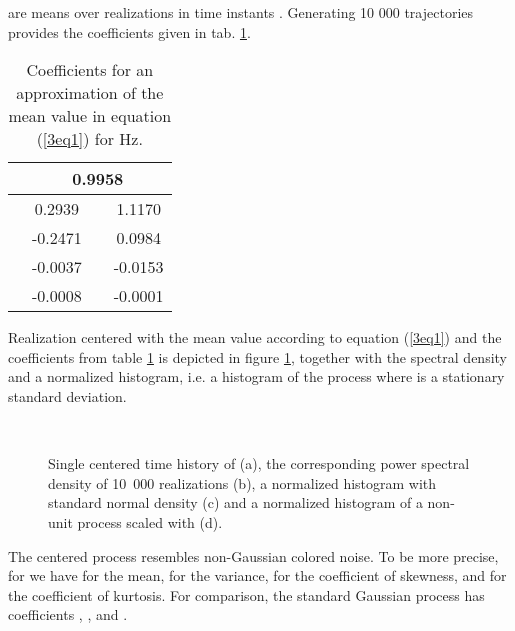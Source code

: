 \documentclass[preprint,12pt,authoryear]{elsarticle}
\begin{document}
are means over  realizations  in time instants . Generating 10 000 trajectories provides the coefficients given in tab. \ref{3tab1}.
\begin{table}
	\centering
	\caption{Coefficients  for an approximation of the mean value in equation (\ref{3eq1}) for  Hz.}
	\begin{tabular}{|c|c|c|c|}\hline
	 & \multicolumn{3}{c|}{0.9958} \\\hline
	 & 0.2939 &  & 1.1170 \\
	 & -0.2471 &  & 0.0984 \\
	 & -0.0037 &  & -0.0153 \\
	 & -0.0008 &  & -0.0001 \\\hline
	\end{tabular}
	\label{3tab1}
\end{table}
Realization centered with the mean value according to equation (\ref{3eq1}) and the coefficients from table \ref{3tab1} is  depicted in figure \ref{3fig2}, together with the spectral density and a normalized histogram, i.e. a histogram of the process  where  is a stationary standard deviation.
\begin{figure}
	\centering
  \\
	\caption{Single centered time history of  (a), the corresponding power spectral density of 10~000 realizations (b), a normalized histogram with standard normal density (c) and a normalized histogram of a non-unit process scaled with  (d).}
	\label{3fig2}
\end{figure}
The centered process resembles non-Gaussian colored noise. To be more precise, for  we have  for the mean,  for the variance,  for the coefficient of skewness, and  for the coefficient of kurtosis. For comparison, the standard Gaussian process has coefficients , ,  and .
\end{document}
